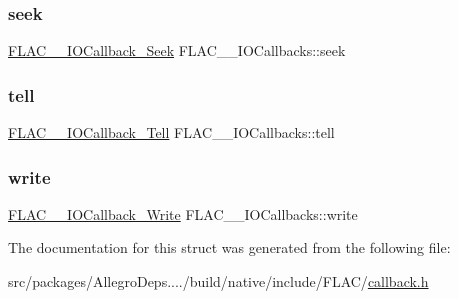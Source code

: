 \mbox{\label{struct_f_l_a_c_____i_o_callbacks_aa1a6f4623965a2d9fcc09b92fabaa1ee}} 
\subsubsection{\texorpdfstring{seek}{seek}}
{\footnotesize\ttfamily \hyperlink{group__flac__callbacks_gab3942bbbd6ae09bcefe7cb3a0060c49c}{F\+L\+A\+C\+\_\+\+\_\+\+I\+O\+Callback\+\_\+\+Seek} F\+L\+A\+C\+\_\+\+\_\+\+I\+O\+Callbacks\+::seek}

\mbox{\label{struct_f_l_a_c_____i_o_callbacks_a8ff0d175a7b3e9318270e305918df827}} 
\subsubsection{\texorpdfstring{tell}{tell}}
{\footnotesize\ttfamily \hyperlink{group__flac__callbacks_ga45314930cabc2e9c04867eae6bca309f}{F\+L\+A\+C\+\_\+\+\_\+\+I\+O\+Callback\+\_\+\+Tell} F\+L\+A\+C\+\_\+\+\_\+\+I\+O\+Callbacks\+::tell}

\mbox{\label{struct_f_l_a_c_____i_o_callbacks_ad64901e5a5710ee4c3c157c75d51ddc0}} 
\subsubsection{\texorpdfstring{write}{write}}
{\footnotesize\ttfamily \hyperlink{group__flac__callbacks_gad991792235879aecae289b56a112e1b8}{F\+L\+A\+C\+\_\+\+\_\+\+I\+O\+Callback\+\_\+\+Write} F\+L\+A\+C\+\_\+\+\_\+\+I\+O\+Callbacks\+::write}



The documentation for this struct was generated from the following file\+:\begin{DoxyCompactItemize}
\item 
src/packages/\+Allegro\+Deps..../build/native/include/\+F\+L\+A\+C/\hyperlink{callback_8h}{callback.\+h}\end{DoxyCompactItemize}
